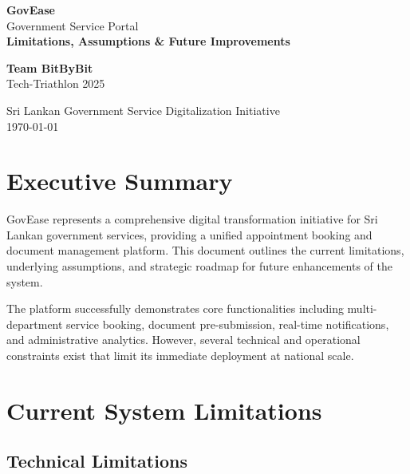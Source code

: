 \documentclass[12pt,a4paper]{article}
\begin{document}
\begin{titlepage}
    \centering
    \vspace*{2cm}
    
    {\Huge\bfseries\color{primaryblue} GovEase}\\[0.5cm]
    {\Large Government Service Portal}\\[2cm]
    
    {\LARGE\bfseries Limitations, Assumptions \& Future Improvements}\\[1cm]
    
    \vspace{2cm}
    
    {\large\bfseries Team BitByBit}\\[0.5cm]
    {\large Tech-Triathlon 2025}\\[2cm]
    
    \vfill
    
    {\large Sri Lankan Government Service Digitalization Initiative}\\[0.5cm]
    {\today}
    
\end{titlepage}

\newpage
\tableofcontents
\newpage

\section{Executive Summary}

GovEase represents a comprehensive digital transformation initiative for Sri Lankan government services, providing a unified appointment booking and document management platform. This document outlines the current limitations, underlying assumptions, and strategic roadmap for future enhancements of the system.

The platform successfully demonstrates core functionalities including multi-department service booking, document pre-submission, real-time notifications, and administrative analytics. However, several technical and operational constraints exist that limit its immediate deployment at national scale.

\section{Current System Limitations}

\subsection{Technical Limitations}
\end{document}
